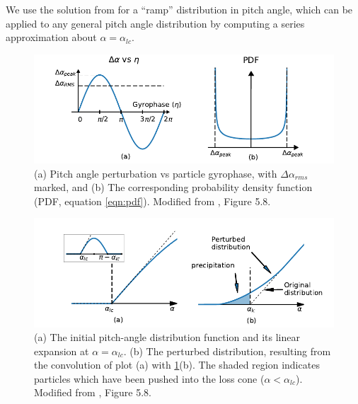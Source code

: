 We use the solution from \cite{Bortnik2005} for a ``ramp'' distribution in pitch angle, which can be applied to any general pitch angle distribution by computing a series approximation about $\alpha = \alpha_{lc}$.

%

\begin{figure}[t]
\begin{center}
\includegraphics{figures/da_dist_and_pdf.pdf}
\caption[Pitch angle perturbation vs gyrophase, and corresponding PDF]{(a) Pitch angle perturbation vs particle gyrophase, with $\Delta \alpha_{rms}$ marked, and (b) The corresponding probability density function (PDF, equation \eqref{eqn:pdf}). Modified from \cite{Bortnik2005}, Figure 5.8.}
\label{fig:da_vs_eta_and_pdf}
\end{center}
\end{figure}

\begin{figure}[h]
\begin{center}
\includegraphics{figures/da_dist_and_perturbation.pdf}
\caption[Perturbed pitch-angle distribution]{(a) The initial pitch-angle distribution function and its linear expansion at $\alpha = \alpha_{lc}$. (b) The perturbed distribution, resulting from the convolution of plot (a) with \ref{fig:da_vs_eta_and_pdf}(b). The shaded region indicates particles which have been pushed into the loss cone ($\alpha < \alpha_{lc}$). Modified from \cite{Bortnik2005}, Figure 5.8.}
\label{fig:da_dist_and_perturbation}
\end{center}
\end{figure}

